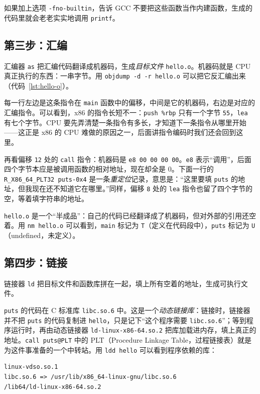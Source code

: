 如果加上选项 \texttt{-fno-builtin}，告诉 GCC 不要把这些函数当作内建函数，生成的代码里就会老老实实地调用 \texttt{printf}。

\subsection{第三步：汇编}

汇编器 \texttt{as} 把汇编代码翻译成机器码，生成\emph{目标文件} \texttt{hello.o}。机器码就是 CPU 真正执行的东西：一串字节。用 \texttt{objdump -d -r hello.o} 可以把它反汇编出来（代码~\ref{lst:hello-o}）。


每一行左边是这条指令在 \texttt{main} 函数中的偏移，中间是它的机器码，右边是对应的汇编指令。可以看到，x86 的指令长短不一：\texttt{push \%rbp} 只有一个字节 \texttt{55}，\texttt{lea} 有七个字节。CPU 要先弄清楚一条指令有多长，才知道下一条指令从哪里开始——这正是 x86 的 CPU 难做的原因之一，后面讲指令编码时我们还会回到这里。

再看偏移 \texttt{12} 处的 \texttt{call} 指令：机器码是 \texttt{e8 00 00 00 00}。\texttt{e8} 表示“调用”，后面四个字节本应是被调用函数的相对地址，现在却全是 0。下面一行的 \texttt{R\_X86\_64\_PLT32 puts-0x4} 是一条\emph{重定位}记录，意思是：“这里要填 \texttt{puts} 的地址，但我现在还不知道它在哪里。”同样，偏移 \texttt{8} 处的 \texttt{lea} 指令也留了四个字节的空，等着填字符串的地址。

\texttt{hello.o} 是一个“半成品”：自己的代码已经翻译成了机器码，但对外部的引用还空着。用 \texttt{nm hello.o} 可以看到，\texttt{main} 标记为 \texttt{T}（定义在代码段中），\texttt{puts} 标记为 \texttt{U}（undefined，未定义）。

\subsection{第四步：链接}

链接器 \texttt{ld} 把目标文件和函数库拼在一起，填上所有空着的地址，生成可执行文件。

\texttt{puts} 的代码在 C 标准库 \texttt{libc.so.6} 中。这是一个\emph{动态链接库}：链接时，链接器并不把 \texttt{puts} 的代码复制进 \texttt{hello}，只是记下“这个程序需要 \texttt{libc.so.6}”；等到程序运行时，再由动态链接器 \texttt{ld-linux-x86-64.so.2} 把库加载进内存，填上真正的地址。\texttt{call puts@PLT} 中的 PLT（Procedure Linkage Table，过程链接表）就是为这件事准备的一个中转站。用 \texttt{ldd hello} 可以看到程序依赖的库：
\begin{verbatim}
linux-vdso.so.1
libc.so.6 => /usr/lib/x86_64-linux-gnu/libc.so.6
/lib64/ld-linux-x86-64.so.2
\end{verbatim}

